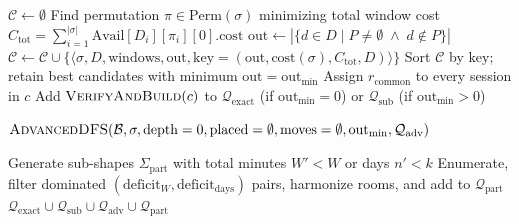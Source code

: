 \documentclass[11pt,a4paper]{article}
\begin{document}
\begin{algorithm}[htbp]
\begin{algorithmic}[1]
\vspace{0.4em}
\State $\mathcal{C} \gets \emptyset$
    \State Find permutation $\pi \in \text{Perm}(\sigma)$ minimizing total window cost $C_{\text{tot}} = \sum_{i=1}^{|\sigma|} \text{Avail}[D_i][\pi_i][0].\text{cost}$
        \State $\text{out} \gets |\{d \in D \mid P \neq \emptyset \;\land\; d \notin P\}|$ 
        \State $\mathcal{C} \gets \mathcal{C} \cup \{\langle \sigma, D, \text{windows}, \text{out}, \text{key}=(\text{out}, \text{cost}(\sigma), C_{\text{tot}}, D) \rangle\}$
    \EndIf
\EndFor
\State Sort $\mathcal{C}$ by $\text{key}$; retain best candidates with minimum $\text{out} = \text{out}_{\min}$
     
        \State Assign $r_{\text{common}}$ to every session in $c$
    \EndIf
    \State Add $\textsc{VerifyAndBuild}(c)$ to $\mathcal{Q}_{\text{exact}}$ (if $\text{out}_{\min}=0$) or $\mathcal{Q}_{\text{sub}}$ (if $\text{out}_{\min}>0$)
\EndFor

\vspace{0.4em}
    \ForAll{$\sigma \in \Sigma[:3]$}
        \State $\textsc{AdvancedDFS}(\mathcal{B}, \sigma, \text{depth}=0, \text{placed}=\emptyset, \text{moves}=\emptyset, \text{out}_{\min}, \mathcal{Q}_{\text{adv}})$
    \EndFor
\EndIf

\vspace{0.4em}
    \State Generate sub-shapes $\Sigma_{\text{part}}$ with total minutes $W' < W$ or days $n' < k$
    \State Enumerate, filter dominated $(\text{deficit}_W, \text{deficit}_{\text{days}})$ pairs, harmonize rooms, and add to $\mathcal{Q}_{\text{part}}$
\EndIf
\State \Return $\mathcal{Q}_{\text{exact}} \cup \mathcal{Q}_{\text{sub}} \cup \mathcal{Q}_{\text{adv}} \cup \mathcal{Q}_{\text{part}}$
\end{algorithmic}
\end{algorithm}
\end{document}
